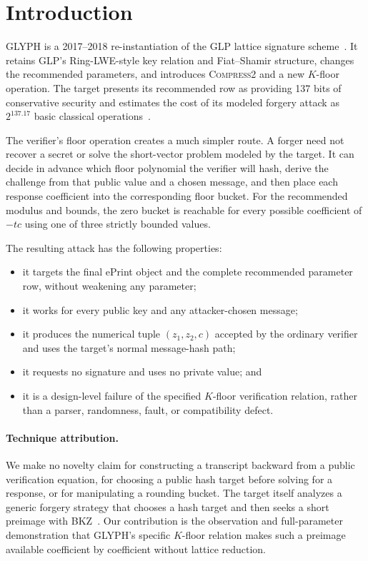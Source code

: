 \documentclass[10pt,a4paper]{article}
\begin{document}
\section{Introduction}

GLYPH is a 2017--2018 re-instantiation of the GLP lattice signature
scheme~\cite{glyph,glp}.  It retains GLP's Ring-LWE-style key relation and
Fiat--Shamir structure, changes the recommended parameters, and introduces
\textsc{Compress2} and a new $K$-floor operation.  The target presents its
recommended row as providing 137 bits of conservative security and estimates
the cost of its modeled forgery attack as $2^{137.17}$ basic classical
operations~\cite{glyph}.

The verifier's floor operation creates a much simpler route.  A forger need
not recover a secret or solve the short-vector problem modeled by the target.
It can decide in advance which floor polynomial the verifier will hash,
derive the challenge from that public value and a chosen message, and then
place each response coefficient into the corresponding floor bucket.  For
the recommended modulus and bounds, the zero bucket is reachable for every
possible coefficient of $-tc$ using one of three strictly bounded values.

The resulting attack has the following properties:
\begin{itemize}
  \item it targets the final ePrint object and the complete recommended
  parameter row, without weakening any parameter;
  \item it works for every public key and any attacker-chosen message;
  \item it produces the numerical tuple $(z_1,z_2,c)$ accepted by the
  ordinary verifier and uses the target's normal message-hash path;
  \item it requests no signature and uses no private value; and
  \item it is a design-level failure of the specified $K$-floor verification
  relation, rather than a parser, randomness, fault, or compatibility defect.
\end{itemize}

\paragraph{Technique attribution.}
We make no novelty claim for constructing a transcript backward from a
public verification equation, for choosing a public hash target before
solving for a response, or for manipulating a rounding bucket.  The target
itself analyzes a generic forgery strategy that chooses a hash target and
then seeks a short preimage with BKZ~\cite{glyph}.  Our contribution is the
observation and full-parameter demonstration that GLYPH's specific
$K$-floor relation makes such a preimage available coefficient by
coefficient without lattice reduction.
\end{document}
